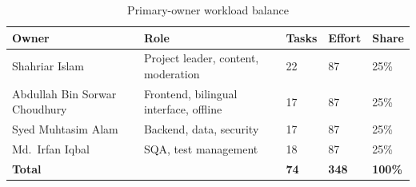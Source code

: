 \documentclass[11pt,a4paper]{article}
\newcommand{\hd}[1]{\textbf{#1}}
\begin{document}
\begin{table}[!htbp]
\centering
\caption{Primary-owner workload balance}\label{tab:workload}
{\small
\begin{tabularx}{\textwidth}{L{48mm} Y C{16mm} C{16mm} C{12mm}}
\toprule
\hd{Owner} & \hd{Role} & \hd{Tasks} & \hd{Effort} & \hd{Share} \\
\midrule
Shahriar Islam & Project leader, content, moderation & 22 & 87 & 25\% \\
Abdullah Bin Sorwar Choudhury & Frontend, bilingual interface, offline & 17 & 87 & 25\% \\
Syed Muhtasim Alam & Backend, data, security & 17 & 87 & 25\% \\
Md.\ Irfan Iqbal & SQA, test management & 18 & 87 & 25\% \\
\midrule
\textbf{Total} & & \textbf{74} & \textbf{348} & \textbf{100\%} \\
\bottomrule
\end{tabularx}
}
\end{table}
\end{document}
